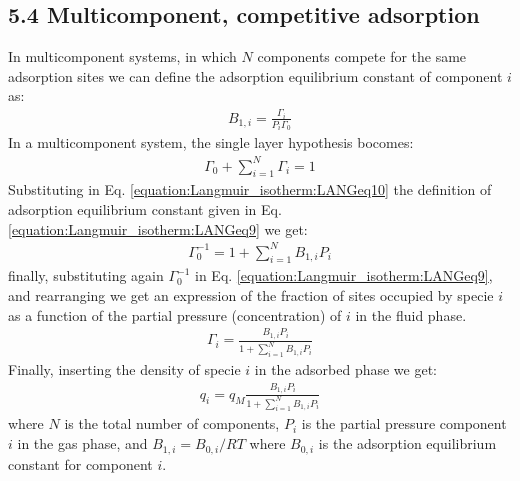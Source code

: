 \documentclass[letterpaper,10pt,english]{jupyterBook}
\begin{document}
\subsection{5.4 Multicomponent, competitive adsorption}
\label{\detokenize{Langmuir_isotherm:multicomponent-competitive-adsorption}}
\sphinxAtStartPar
In multicomponent systems, in which \(N\) components compete for the same adsorption sites we can define the adsorption equilibrium constant of component \(i\) as:
\begin{equation}\label{equation:Langmuir_isotherm:LANGeq9}
\begin{split}
B_{1,i}=\frac{\Gamma_i}{P_i\Gamma_0}
\end{split}
\end{equation}
\sphinxAtStartPar
In a multicomponent system, the single layer hypothesis bocomes:
\begin{equation}\label{equation:Langmuir_isotherm:LANGeq10}
\begin{split}
\Gamma_0+\sum_{i=1}^N{\Gamma_i}=1 
\end{split}
\end{equation}
\sphinxAtStartPar
Substituting in Eq. \eqref{equation:Langmuir_isotherm:LANGeq10} the definition of adsorption equilibrium constant given in Eq. \eqref{equation:Langmuir_isotherm:LANGeq9} we get:
\begin{equation}\label{equation:Langmuir_isotherm:LANGeq11}
\begin{split}
\Gamma_0^{-1}=1+\sum_{i=1}^N{B_{1,i}P_i}
\end{split}
\end{equation}
\sphinxAtStartPar
finally, substituting again \(\Gamma_0^ {-1}\) in Eq. \eqref{equation:Langmuir_isotherm:LANGeq9}, and rearranging we get an expression of the fraction of sites occupied by specie \(i\) as a function of the partial pressure (concentration) of \(i\) in the fluid phase.
\begin{equation}\label{equation:Langmuir_isotherm:LANGeq12}
\begin{split}
\Gamma_i=\frac{B_{1,i}P_i}{1+\sum_{i=1}^NB_{1,i}{P_i}}
\end{split}
\end{equation}
\sphinxAtStartPar
Finally, inserting the density of specie \(i\) in the adsorbed phase we get:
\begin{equation}\label{equation:Langmuir_isotherm:LANGeq13}
\begin{split}
q_i=q_M\frac{B_{1,i}{P_i}}{1+\sum_{i=1}^NB_{1,i}{P_i}}
\end{split}
\end{equation}
\sphinxAtStartPar
where \(N\) is the total number of components, \(P_i\) is the partial pressure component \(i\) in the gas phase, and \(B_{1,i}=B_{0,i}/RT\) where \(B_{0,i}\) is the adsorption equilibrium constant for component \(i\).
\end{document}
